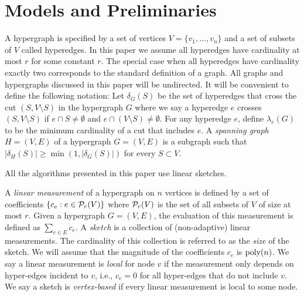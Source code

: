 \section{Models and Preliminaries}

A hypergraph is specified by a set of vertices $V=\{v_1, \ldots, v_n\}$ and a set of subsets of $V$ called hyperedges. In this paper we assume all hyperedges have cardinality at most $r$ for some constant $r$. The special case when all hyperedges have cardinality exactly two corresponds to the standard definition of a graph. All graphs and hypergraphs discussed in this paper will be undirected.
It will be convenient to define the following notation: Let $\delta_G(S)$ be the set of hyperedges that cross the cut $(S,V\setminus S)$ in the hypergraph $G$ where we say a hyperedge $e$ crosses $(S,V\setminus S)$ if $e\cap S\neq \emptyset$ and $e\cap (V\setminus S)\neq \emptyset$. For any hyperedge $e$, define $\lambda_e(G)$ to be the minimum cardinality of a cut that includes $e$. A \emph{spanning graph} $H=(V,E)$ of a hypergraph $G=(V,E)$ is a subgraph such that  $|\delta_{H}(S)|\geq \min (1, |\delta_G(S)|)$ for every $S\subset V$.



All the algorithms presented in this paper use linear sketches.

\begin{definition}
A \emph{linear measurement} of a hypergraph on $n$ vertices is defined by a set of coefficients $\{c_e : e\in \P_r(V)\}$ where $\P_r(V)$ is the set of all subsets of $V$ of size at most $r$. Given a hypergraph $G=(V,E)$, the evaluation of this measurement is defined as 
$\sum_{e\in E} c_e$.
A \emph{sketch} is a collection of (non-adaptive) linear measurements. The cardinality of this collection is referred to as the \emph{size} of the sketch. We will assume that the magnitude of the coefficients $c_e$ is $\poly(n)$. We say a linear measurement is \emph{local} for node $v$ if the measurement only depends on hyper-edges incident to $v$, i.e., $c_e=0$ for all hyper-edges that do not include $v$. We say a sketch is \emph{vertex-based} if every linear measurement is local to some node.\end{definition}

